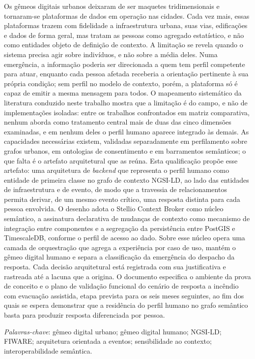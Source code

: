 \noindent Os gêmeos digitais urbanos deixaram de ser maquetes tridimensionais e
tornaram-se plataformas de dados em operação nas cidades. Cada vez mais, essas plataformas trazem com fidelidade a infraestrutura urbana, suas vias, edificações e dados de forma geral, mas tratam as pessoas como agregado estatístico, e não como entidades objeto de definição de contexto. A limitação se revela quando o sistema precisa agir sobre indivíduos, e não sobre a média deles. Numa emergência, a informação poderia ser direcionada a quem tem perfil competente para atuar, enquanto cada pessoa afetada receberia a orientação pertinente à sua própria condição; sem perfil no modelo de contexto, porém, a plataforma só é capaz de emitir a mesma mensagem para todos. O mapeamento sistemático da literatura conduzido neste trabalho mostra que a limitação é do campo, e não de implementações isoladas: entre os trabalhos confrontados em matriz comparativa, nenhum aborda como tratamento central mais de duas das cinco dimensões examinadas, e em nenhum deles o perfil humano aparece integrado às demais. As capacidades necessárias existem, validadas separadamente em perfilamento sobre grafos urbanos, em ontologias de consentimento e em barramentos semânticos; o que falta é o artefato arquitetural que as reúna. Esta qualificação propõe esse artefato: uma arquitetura de \textit{backend} que representa o perfil humano como entidade de primeira classe no grafo de contexto NGSI-LD, ao lado das entidades de infraestrutura e de evento, de modo que a travessia de relacionamentos permita derivar, de um mesmo evento crítico, uma resposta distinta para cada pessoa envolvida. O desenho adota o Stellio Context Broker como núcleo semântico, a assinatura declarativa de mudanças de contexto como mecanismo de integração entre componentes e a segregação da persistência entre PostGIS e TimescaleDB, conforme o perfil de acesso ao dado. Sobre esse núcleo opera uma camada de orquestração que agrega a experiência por caso de uso, mantém o gêmeo digital humano e separa a classificação da emergência do despacho da resposta. Cada decisão arquitetural está registrada com sua justificativa e rastreada até a lacuna que a origina. O documento especifica o ambiente da prova de conceito e o plano de validação funcional do cenário de resposta a incêndio com evacuação assistida, etapa prevista para os seis meses seguintes, ao fim dos quais se espera demonstrar que a residência do perfil humano no grafo semântico basta para produzir resposta diferenciada por pessoa.

\noindent\textit{Palavras-chave}: gêmeo digital urbano; gêmeo digital humano;
NGSI-LD; FIWARE; arquitetura orientada a eventos; sensibilidade ao contexto; interoperabilidade semântica.
